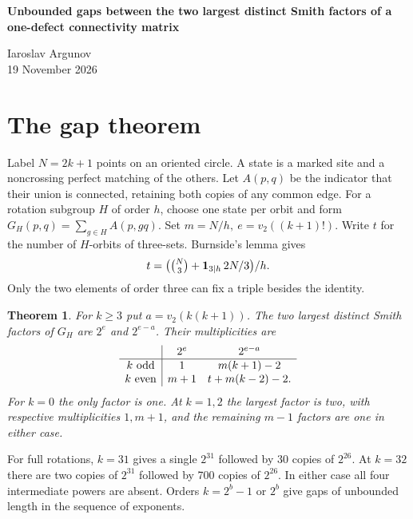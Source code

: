 \documentclass[11pt]{article}
\newtheorem{theorem}{Theorem}
\newcommand{\val}{v_2}
\begin{document}
\begin{center}
{\Large\bfseries Unbounded gaps between the two largest distinct Smith factors of a one-defect connectivity matrix\par}
\medskip Iaroslav Argunov\\[2pt] 19 November 2026
\end{center}
\begin{abstract}
Sum connected gluings of marked noncrossing matchings over a subgroup
of rotations on \(2k+1\) sites. For \(k\ge3\) the quotient of the two
largest distinct integer Smith factors is the largest power of two
dividing the even member of \(\{k,k+1\}\). We determine both multiplicities
for every subgroup. The gap follows from complementing the incidence
generators of the dual lattice. The surviving form at its far end is a
binary incidence pairing involving only points, pairs, triples and four-sets.
\end{abstract}

\section{The gap theorem}
Label \(N=2k+1\) points on an oriented circle. A state is a marked site and
a noncrossing perfect matching of the others. Let \(A(p,q)\) be the
indicator that their union is connected, retaining both copies of any
common edge. For a rotation subgroup \(H\) of order \(h\), choose one
state per orbit and form \(G_H(p,q)=\sum_{g\in H}A(p,gq)\).
Set \(m=N/h,\ e=\val((k+1)!)\). Write \(t\) for the number of
\(H\)-orbits of three-sets. Burnside's lemma gives
\[
 t=\bigl(\tbinom N3+{\bf1}_{3\mid h}\,2N/3\bigr)/h.
\]
Only the two elements of order three can fix a triple besides the identity.

\begin{theorem}\label{thm}
For \(k\ge3\) put \(a=\val(k(k+1))\). The two largest distinct Smith
factors of \(G_H\) are \(2^e\) and \(2^{e-a}\). Their multiplicities are
\[
\begin{array}{c|cc}
 &2^e&2^{e-a}\\ \hline
k\ {\rm odd}&1&m(k+1)-2\\
k\ {\rm even}&m+1&t+m(k-2)-2.
\end{array}
\]
For \(k=0\) the only factor is one. At \(k=1,2\) the largest
factor is two, with respective multiplicities \(1,m+1\), and the
remaining \(m-1\) factors are one in either case.
\end{theorem}
For full rotations, \(k=31\) gives a single \(2^{31}\) followed by
30 copies of \(2^{26}\). At \(k=32\) there are two copies of \(2^{31}\)
followed by 700 copies of \(2^{26}\). In either case all four intermediate
powers are absent. Orders \(k=2^b-1\) or \(2^b\) give gaps of unbounded
length in the sequence of exponents.
\end{document}
